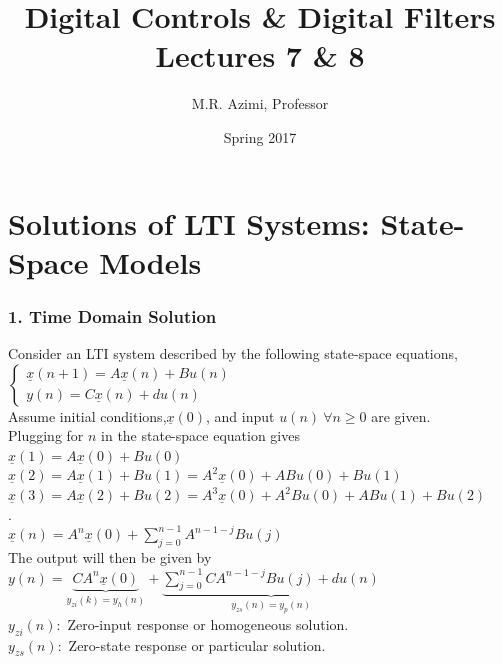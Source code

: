 \documentclass[mathserif, 10pt]{beamer} %
\title[Digital Control \& Digital Filters]{Digital Controls \& Digital Filters \\ Lectures 7 \& 8}
\author[M.R. Azimi]{M.R. Azimi, Professor}
\institute[CSU-ECE]{Department of Electrical and Computer Engineering \\ Colorado State University}
\date{Spring 2017}
\def\x{\underline{x}}
\begin{document}

\frame{\titlepage}



\section{Solutions of LTI Systems: State-Space Models}

\frame
{

\normalsize

\frametitle{1. Time Domain Solution}


Consider an LTI system described by the following state-space equations, \\ $ \left\{
\begin{array}{l}
	\x(n+1) = A\x(n)+Bu(n)\\
	y(n) = C\x(n) +du(n)
\end{array} \right.$\\
Assume initial conditions,$\x(0)$, and input $u(n) ~\forall n \ge 0 $ are given.\\
Plugging for $n$ in the state-space equation gives\\
 $\x(1) = A \x(0)+Bu(0)$\\
$\x(2) = A \x(1)+Bu(1) = A^2\x(0) + AB u(0) + Bu(1)$\\
$ \x(3) = A \x(2) + Bu(2) = A^3 \x(0) + A^2Bu(0)+ABu(1)+Bu(2)$\\
.\\
$\x(n) = A^n  \x(0)+\sum\limits_{j=0}^{n-1} A^{n-1-j}Bu(j)$\\
The output will then be given by $y(n) =\underbrace{CA^n\x(0)}_{y_{zi}(k) = y_h(n)} + \underbrace{\sum\limits_{j=0}^{n-1}CA^{n-1-j}Bu(j) + du(n)}_{y_{zs}(n) = y_p(n)}$ \\ \vspace{.05in}
$y_{zi}(n):$ Zero-input response or homogeneous solution. \\
$y_{zs}(n):$ Zero-state response or particular solution.\\


}
\end{document}
